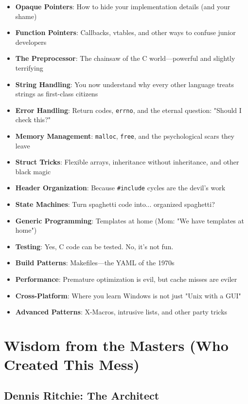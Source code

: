 \documentclass[10pt,openany]{book}
\begin{document}
\begin{itemize}
    \item \textbf{Opaque Pointers}: How to hide your implementation details (and your shame)
    \item \textbf{Function Pointers}: Callbacks, vtables, and other ways to confuse junior developers
    \item \textbf{The Preprocessor}: The chainsaw of the C world---powerful and slightly terrifying
    \item \textbf{String Handling}: You now understand why every other language treats strings as first-class citizens
    \item \textbf{Error Handling}: Return codes, \texttt{errno}, and the eternal question: "Should I check this?"
    \item \textbf{Memory Management}: \texttt{malloc}, \texttt{free}, and the psychological scars they leave
    \item \textbf{Struct Tricks}: Flexible arrays, inheritance without inheritance, and other black magic
    \item \textbf{Header Organization}: Because \texttt{\#include} cycles are the devil's work
    \item \textbf{State Machines}: Turn spaghetti code into... organized spaghetti?
    \item \textbf{Generic Programming}: Templates at home (Mom: "We have templates at home")
    \item \textbf{Testing}: Yes, C code can be tested. No, it's not fun.
    \item \textbf{Build Patterns}: Makefiles---the YAML of the 1970s
    \item \textbf{Performance}: Premature optimization is evil, but cache misses are eviler
    \item \textbf{Cross-Platform}: Where you learn Windows is not just "Unix with a GUI"
    \item \textbf{Advanced Patterns}: X-Macros, intrusive lists, and other party tricks
\end{itemize}

\section*{Wisdom from the Masters (Who Created This Mess)}

\subsection*{Dennis Ritchie: The Architect}
\end{document}
